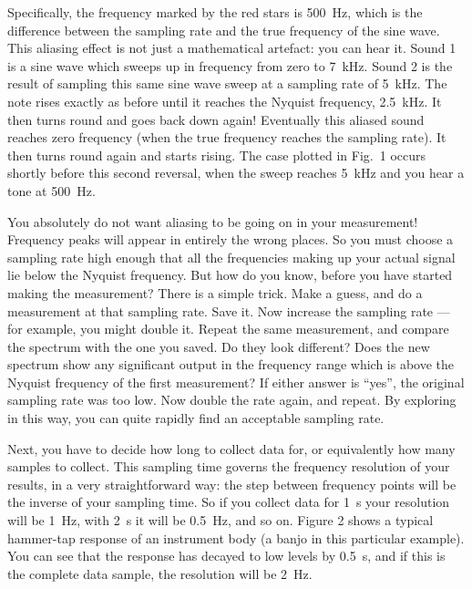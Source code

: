 
  Specifically, the frequency marked by the red stars is 500~Hz, which is the 
  difference between the sampling rate and the true frequency of the sine wave. 
  This aliasing effect is not just a mathematical artefact: you can hear it. 
  Sound 1 is a sine wave which sweeps up in frequency from zero to 7~kHz. Sound 
  2 is the result of sampling this same sine wave sweep at a sampling rate of 
  5~kHz. The note rises exactly as before until it reaches the Nyquist 
  frequency, 2.5~kHz. It then turns round and goes back down again! Eventually 
  this aliased sound reaches zero frequency (when the true frequency reaches 
  the sampling rate). It then turns round again and starts rising. The case 
  plotted in Fig.\ 1 occurs shortly before this second reversal, when the sweep 
  reaches 5~kHz and you hear a tone at 500~Hz. 

\audio{}

\audio{}

  You absolutely do not want aliasing to be going on in your measurement! 
  Frequency peaks will appear in entirely the wrong places. So you must choose 
  a sampling rate high enough that all the frequencies making up your actual 
  signal lie below the Nyquist frequency. But how do you know, before you have 
  started making the measurement? There is a simple trick. Make a guess, and do 
  a measurement at that sampling rate. Save it. Now increase the sampling rate 
  — for example, you might double it. Repeat the same measurement, and compare 
  the spectrum with the one you saved. Do they look different? Does the new 
  spectrum show any significant output in the frequency range which is above 
  the Nyquist frequency of the first measurement? If either answer is “yes”, 
  the original sampling rate was too low. Now double the rate again, and 
  repeat. By exploring in this way, you can quite rapidly find an acceptable 
  sampling rate. 

  Next, you have to decide how long to collect data for, or equivalently how 
  many samples to collect. This sampling time governs the frequency resolution 
  of your results, in a very straightforward way: the step between frequency 
  points will be the inverse of your sampling time. So if you collect data for 
  1~s your resolution will be 1~Hz, with 2~s it will be 0.5~Hz, and so on. 
  Figure 2 shows a typical hammer-tap response of an instrument body (a banjo 
  in this particular example). You can see that the response has decayed to low 
  levels by 0.5~s, and if this is the complete data sample, the resolution will 
  be 2~Hz. 

